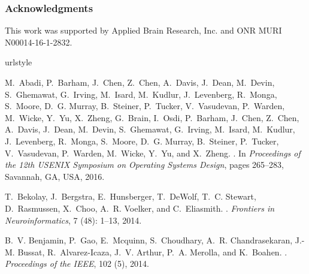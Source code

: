 \documentclass{article}
\begin{document}
\subsubsection*{Acknowledgments}

This work was supported by Applied Brain Research, Inc. and ONR MURI N00014-16-1-2832.

\small



\begin{thebibliography}{29}
\providecommand{\natexlab}[1]{#1}
\providecommand{\url}[1]{\texttt{#1}}
\expandafter\ifx\csname urlstyle\endcsname\relax
  \providecommand{\doi}[1]{doi: #1}\else
  \providecommand{\doi}{doi: \begingroup \urlstyle{rm}\Url}\fi

M.~Abadi, P.~Barham, J.~Chen, Z.~Chen, A.~Davis, J.~Dean, M.~Devin,
  S.~Ghemawat, G.~Irving, M.~Isard, M.~Kudlur, J.~Levenberg, R.~Monga,
  S.~Moore, D.~G. Murray, B.~Steiner, P.~Tucker, V.~Vasudevan, P.~Warden,
  M.~Wicke, Y.~Yu, X.~Zheng, G.~Brain, I.~Osdi, P.~Barham, J.~Chen, Z.~Chen,
  A.~Davis, J.~Dean, M.~Devin, S.~Ghemawat, G.~Irving, M.~Isard, M.~Kudlur,
  J.~Levenberg, R.~Monga, S.~Moore, D.~G. Murray, B.~Steiner, P.~Tucker,
  V.~Vasudevan, P.~Warden, M.~Wicke, Y.~Yu, and X.~Zheng.
.
\newblock In \emph{{Proceedings of the 12th USENIX Symposium on Operating
  Systems Design}}, pages 265--283, Savannah, GA, USA, 2016.

T.~Bekolay, J.~Bergstra, E.~Hunsberger, T.~DeWolf, T.~C. Stewart, D.~Rasmussen,
  X.~Choo, A.~R. Voelker, and C.~Eliasmith.
.
\newblock \emph{Frontiers in Neuroinformatics}, 7 (48):
  1--13, 2014.

B.~V. Benjamin, P.~Gao, E.~Mcquinn, S.~Choudhary, A.~R. Chandrasekaran, J.-M.
  Bussat, R.~Alvarez-Icaza, J.~V. Arthur, P.~A. Merolla, and K.~Boahen.
.
\newblock \emph{Proceedings of the IEEE}, 102 (5), 2014.


\end{thebibliography}
\end{document}
